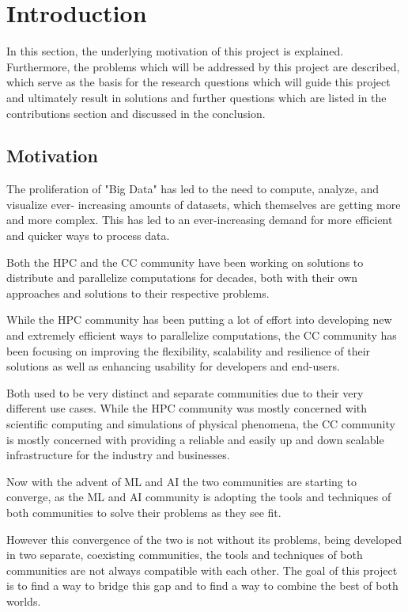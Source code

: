 \chapter{Introduction}
\label{Introduction}

In this section, the underlying motivation of this project is explained.
Furthermore, the problems which will be addressed by this project are described,
which serve as the basis for the research questions which will guide this project and ultimately
result in solutions and further questions which are listed in the contributions section and discussed in the conclusion.

\section{Motivation}

The proliferation of "Big Data" has led to the need to compute, analyze, and visualize ever-
increasing amounts of datasets, which themselves are getting more and more complex.
This has  led to an ever-increasing demand for more efficient and quicker ways to process data.

Both the \ac{HPC} and the \ac{CC} community have been working on solutions to distribute and parallelize computations for decades, 
both with their own approaches and solutions to their respective problems.

While the \ac{HPC} community has been putting a lot of effort into developing new and extremely efficient ways to parallelize computations,
the \ac{CC} community has been focusing on improving the flexibility, scalability and resilience of their solutions as well as enhancing usability for developers and end-users.

Both used to be very distinct and separate communities due to their very different use cases.
While the \ac{HPC} community was mostly concerned with scientific computing and simulations of physical phenomena,
the \ac{CC} community is mostly concerned with providing a reliable and easily up and down scalable infrastructure for the industry and businesses.

Now with the advent of \ac{ML} and \ac{AI} the two communities are starting to converge, 
as the \ac{ML} and \ac{AI} community is adopting the tools and techniques of both communities to solve their problems as they see fit.

However this convergence of the two is not without its problems, being developed in two separate, coexisting communities, the tools and techniques of both communities are not always compatible with each other.
The goal of this project is to find a way to bridge this gap and to find a way to combine the best of both worlds.

